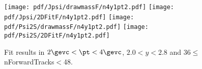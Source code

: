 \begin{figure}[H]
\begin{center}
\texttt{[image: pdf/Jpsi/drawmassF/n4y1pt2.pdf]}
\texttt{[image: pdf/Jpsi/2DFitF/n4y1pt2.pdf]}
\vspace*{-0.5cm}
\texttt{[image: pdf/Psi2S/drawmassF/n4y1pt2.pdf]}
\texttt{[image: pdf/Psi2S/2DFitF/n4y1pt2.pdf]}
\vspace*{-0.5cm}
\end{center}
\caption{Fit results in $2\gevc<\pt<4\gevc$, $2.0<y<2.8$ and 36$\leq$nForwardTracks$<$48.}
\label{Fitn4y1pt2}
\end{figure}
